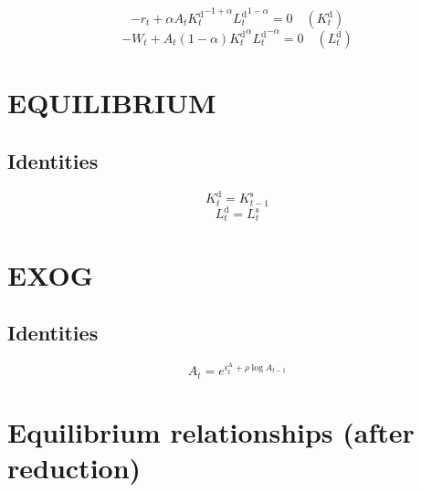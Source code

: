 \begin{equation}
-r_{t} + {\alpha} {A_{t}} {{K^{\mathrm{d}}_{t}}^{-1 + \alpha}} {{L^{\mathrm{d}}_{t}}^{1 - \alpha}} = 0
 \quad \left(K^{\mathrm{d}}_{t}\right)
\end{equation}
\begin{equation}
-W_{t} + {A_{t}} \left(1 - \alpha\right) {{K^{\mathrm{d}}_{t}}^{\alpha}} {{L^{\mathrm{d}}_{t}}^{-\alpha}} = 0
 \quad \left(L^{\mathrm{d}}_{t}\right)
\end{equation}




\section{EQUILIBRIUM}

\subsection{Identities}

\begin{equation}
K^{\mathrm{d}}_{t} = K^{\mathrm{s}}_{t-1}
\end{equation}
\begin{equation}
L^{\mathrm{d}}_{t} = L^{\mathrm{s}}_{t}
\end{equation}




\section{EXOG}

\subsection{Identities}

\begin{equation}
A_{t} = e^{\epsilon^{\mathrm{A}}_{t} + {\rho} {\log{A_{t-1}}}}
\end{equation}




\section{Equilibrium relationships (after reduction)}

